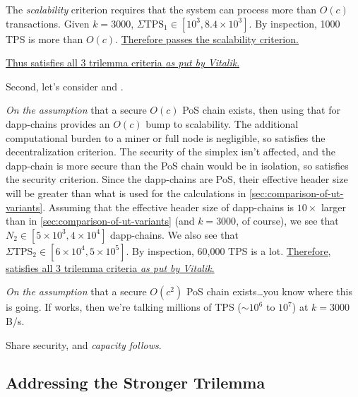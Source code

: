 The \emph{scalability} criterion requires that the system can process more than $O(c)$ transactions.
Given $k = 3000$, $\Sigma \text{TPS}_1 \in [10^3, 8.4\times10^3]$.
By inspection, 1000 TPS is more than $O(c)$.
\ul{Therefore  passes the scalability criterion.}


\ul{Thus  satisfies all 3 trilemma criteria \emph{as put by Vitalik}.}


Second, let's consider  and .

\emph{On the assumption} that a secure $O(c)$ PoS chain exists, then using that for dapp-chains provides an $O(c)$ bump to scalability.
The additional computational burden to a miner or full node is negligible, so  satisfies the decentralization criterion.
The security of the simplex isn't affected, and the dapp-chain is more secure than the PoS chain would be in isolation, so  satisfies the security criterion.
Since the dapp-chains are PoS, their effective header size will be greater than what is used for the calculations in \autoref{sec:comparison-of-ut-variants}.
Assuming that the effective header size of dapp-chains is $10\times$ larger than in \autoref{sec:comparison-of-ut-variants} (and $k = 3000$, of course), we see that $N_2 \in [5\times10^3, 4\times10^4]$ dapp-chains.
We also see that $\Sigma \text{TPS}_2 \in [6\times10^4, 5\times10^5]$.
By inspection, 60,000 TPS is a lot.
\ul{Therefore,  satisfies all 3 trilemma criteria \emph{as put by Vitalik}.}

\emph{On the assumption} that a secure $O(c^2)$ PoS chain exists\dots you know where this is going.
If  works, then we're talking millions of TPS ($\sim 10^6$ to $10^7$) at $k = 3000$ B/s.

Share security, and \emph{capacity follows}.


\subsection{Addressing the Stronger Trilemma}

